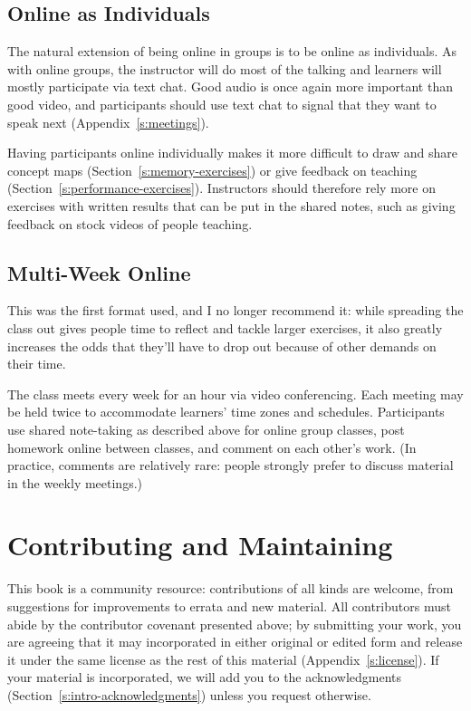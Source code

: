 \subsection*{Online as Individuals}

The natural extension of being online in groups is to be online as
individuals. As with online groups, the instructor will do most of the
talking and learners will mostly participate via text chat. Good audio
is once again more important than good video, and participants should
use text chat to signal that they want to speak next
(Appendix~\ref{s:meetings}).

Having participants online individually makes it more difficult to draw
and share concept maps (Section~\ref{s:memory-exercises}) or give
feedback on teaching (Section~\ref{s:performance-exercises}). Instructors
should therefore rely more on exercises with written results that can be
put in the shared notes, such as giving feedback on stock videos of
people teaching.

\subsection*{Multi-Week Online}

This was the first format used, and I no longer recommend it: while
spreading the class out gives people time to reflect and tackle larger
exercises, it also greatly increases the odds that they'll have to drop
out because of other demands on their time.

The class meets every week for an hour via video conferencing. Each
meeting may be held twice to accommodate learners' time zones and
schedules. Participants use shared note-taking as described above for
online group classes, post homework online between classes, and comment
on each other's work. (In practice, comments are relatively rare: people
strongly prefer to discuss material in the weekly meetings.)

\section{Contributing and Maintaining}\label{s:joining-contributing}

This book is a community resource: contributions of all kinds are
welcome, from suggestions for improvements to errata and new material.
All contributors must abide by the contributor covenant presented above;
by submitting your work, you are agreeing that it may incorporated in
either original or edited form and release it under the same license as
the rest of this material (Appendix~\ref{s:license}). If your material is
incorporated, we will add you to the acknowledgments
(Section~\ref{s:intro-acknowledgments}) unless you request otherwise.

